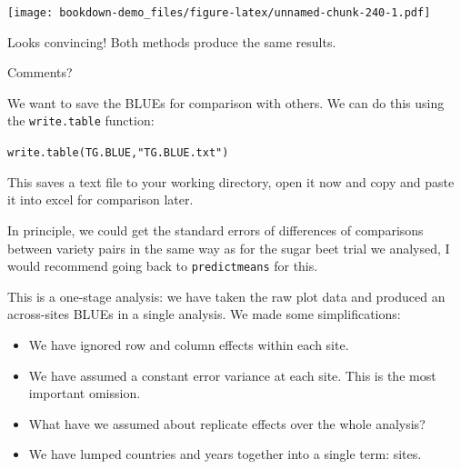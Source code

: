 \documentclass[
]{book}
\newenvironment{Shaded}{\begin{snugshade}}{\end{snugshade}}
\newcommand{\CommentTok}[1]{\textcolor[rgb]{0.56,0.35,0.01}{\textit{#1}}}
\newcommand{\DecValTok}[1]{\textcolor[rgb]{0.00,0.00,0.81}{#1}}
\newcommand{\FloatTok}[1]{\textcolor[rgb]{0.00,0.00,0.81}{#1}}
\newcommand{\FunctionTok}[1]{\textcolor[rgb]{0.00,0.00,0.00}{#1}}
\newcommand{\NormalTok}[1]{#1}
\newcommand{\OtherTok}[1]{\textcolor[rgb]{0.56,0.35,0.01}{#1}}
\newcommand{\SpecialCharTok}[1]{\textcolor[rgb]{0.00,0.00,0.00}{#1}}
\newcommand{\StringTok}[1]{\textcolor[rgb]{0.31,0.60,0.02}{#1}}
\begin{document}
\begin{Shaded}
\end{Shaded}

\texttt{[image: bookdown-demo\_files/figure-latex/unnamed-chunk-240-1.pdf]}

Looks convincing! Both methods produce the same results.

Comments?

We want to save the BLUEs for comparison with others. We can do this using the \texttt{write.table} function:

\texttt{write.table(TG.BLUE,"TG.BLUE.txt")}

This saves a text file to your working directory, open it now and copy and paste it into excel for comparison later.

In principle, we could get the standard errors of differences of comparisons between variety pairs in the same way as for the sugar beet trial we analysed, I would recommend going back to \texttt{predictmeans} for this.

This is a one-stage analysis: we have taken the raw plot data and produced an across-sites BLUEs in a single analysis. We made some simplifications:

\begin{itemize}
\item
  We have ignored row and column effects within each site.
\item
  We have assumed a constant error variance at each site. This is the most important omission.
\item
  What have we assumed about replicate effects over the whole analysis?
\item
  We have lumped countries and years together into a single term: sites.
\end{itemize}
\end{document}

